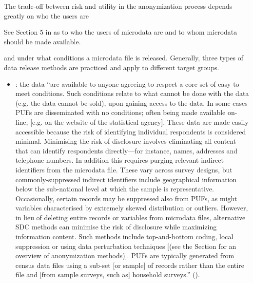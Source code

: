 \documentclass[letterpaper,10pt,english]{sphinxmanual}
\begin{document}
The trade-off between risk and utility in the anonymization process
depends greatly on who the users are %
\begin{footnote}[1]\sphinxAtStartFootnote
See Section 5 in {\hyperref[\detokenize{release_types:dubo10}]{}} as to who the users of
microdata are and to whom microdata should be made available.
%
\end{footnote} and under
what conditions a microdata file is released. Generally, three types of
data release methods are practiced and apply to different target groups.
\begin{itemize}
\item {} 
: the data “are available to anyone agreeing
to respect a core set of easy-to-meet conditions. Such conditions
relate to what cannot be done with the data (e.g. the data cannot be
sold), upon gaining access to the data. In some cases PUFs are
disseminated with no conditions; often being made available on-line,
{[}e.g. on the website of the statistical agency{]}. These data are made
easily accessible because the risk of identifying individual
respondents is considered minimal. Minimising the risk of disclosure
involves eliminating all content that can identify respondents
directly—for instance, names, addresses and telephone numbers. In
addition this requires purging relevant indirect identifiers from the
microdata file. These vary across survey designs, but
commonly-suppressed indirect identifiers include geographical
information below the sub-national level at which the sample is
representative. Occasionally, certain records may be suppressed also
from PUFs, as might variables characterised by extremely skewed
distribution or outliers. However, in lieu of deleting entire records
or variables from microdata files, alternative SDC methods can
minimise the risk of disclosure while maximizing information content.
Such methods include top-and-bottom coding, local suppression or
using data perturbation techniques {[}(see the Section
 for an overview of
anonymization methods){]}. PUFs are typically generated from census
data files using a sub-set {[}or sample{]} of records rather than the
entire file and {[}from sample surveys, such as{]} household surveys.”
({\hyperref[\detokenize{release_types:dubo10}]{}}).


\end{itemize}
\end{document}
